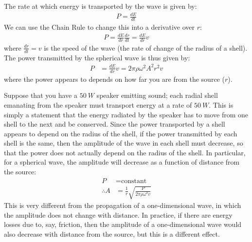 The rate at which energy is transported by the wave is given by:
\begin{align*}
P = \frac{dE}{dt}
\end{align*}
We can use the Chain Rule to change this into a derivative over $r$:
\begin{align*}
P = \frac{dE}{dr}\frac{dr}{dt}=\frac{dE}{dr}v
\end{align*}
where $\frac{dr}{dt}=v$ is the speed of the wave (the rate of change of the radius of a shell). The power transmitted by the spherical wave is thus given by:
\begin{align*}
P &=\frac{dE}{dr}v =2\pi\rho  \omega^2 A^2  r^2 v
\end{align*}
where the power appears to depends on how far you are from the source ($r$). 

Suppose that you have a $\SI{50}{W}$ speaker emitting sound; each radial shell emanating from the speaker must transport energy at a rate of $\SI{50}{W}$. This is simply a statement that the energy radiated by the speaker has to move from one shell to the next and be conserved. Since the power transported by a shell appears to depend on the radius of the shell, if the power transmitted by each shell is the same, then the amplitude of the wave in each shell must decrease, so that the power does not actually depend on the radius of the shell. In particular, for a spherical wave, the amplitude will decrease as a function of distance from the source:
\begin{align*}
P& = \text{constant}\\
\therefore A&=\frac{1}{r}\sqrt{\frac{P}{2\pi\rho \omega^2 v}}
\end{align*}
This is very different from the propagation of a one-dimensional wave, in which the amplitude does not change with distance. In practice, if there are energy losses due to, say, friction, then the amplitude of a one-dimensional wave would also decrease with distance from the source, but this is a different effect.

